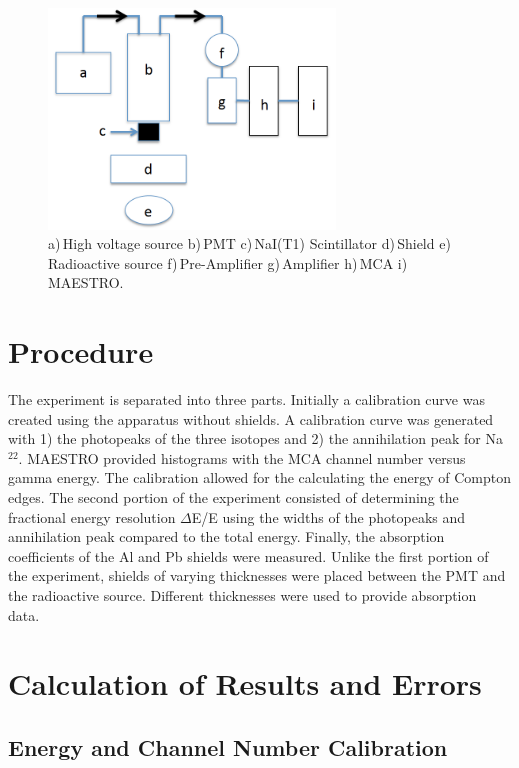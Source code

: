 \documentclass[aps,prl,twocolumn,superscriptaddress,nofootinbib]{revtex4-1}
\begin{document}
\begin{figure}[h!]
  \begin{center}
\centerline{\includegraphics[width=3in]{nuke.png}}
\caption{\small{a)\,High voltage source b)\,PMT c)\,NaI(T1) Scintillator d)\,Shield e)\,Radioactive source f)\,Pre-Amplifier g)\,Amplifier h)\,MCA i)\,MAESTRO.\,\cite{5} \label{fig2}}}
  \end{center}
\end{figure}
\vspace{-.7cm}

\section{Procedure}

The experiment is separated into three parts. Initially a calibration curve was created using the apparatus without shields. A calibration curve was generated with 1) the photopeaks of the three isotopes and 2) the annihilation peak for Na$^{22}$. MAESTRO provided histograms with the MCA channel number versus gamma energy. The calibration allowed for the calculating the energy of Compton edges. The second portion of the experiment consisted of determining the fractional energy resolution $\Delta$E/E using the widths of the photopeaks and annihilation peak compared to the total energy. Finally, the absorption coefficients of the Al and Pb shields were measured. Unlike the first portion of the experiment, shields of varying thicknesses were placed between the PMT and the radioactive source. Different thicknesses were used to provide absorption data.


\vfill\eject

\section{Calculation of Results and Errors}

\subsection{Energy and Channel Number Calibration}
\end{document}
